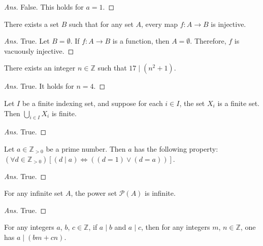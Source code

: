 \documentclass[12pt]{article}
\newenvironment{problem}[2][Problem]{\begin{trivlist}
\item[\hskip \labelsep {\bfseries #1}\hskip \labelsep {\bfseries #2.}]}{\end{trivlist}}
\begin{document}
\begin{proof}[Ans]
False. This holds for $a = 1$.
\end{proof}

\begin{problem}{17}
There exists a set $B$ such that for any set $A$,
every map $f : A \rightarrow B$ is injective.

\end{problem}

\begin{proof}[Ans]
True. Let $B = \emptyset$. If $f : A \to B$ is a function, then $A = \emptyset$. Therefore, $f$ is vacuously injective.
\end{proof}

\begin{problem}{18}
There exists an integer $n \in \mathbb{Z}$ such that $17 \mid (n^2+1)$.
\end{problem}

\begin{proof}[Ans]
True. It holds for $n = 4$.
\end{proof}

\begin{problem}{19}
Let $I$ be a finite indexing set, and suppose for each $i \in I$,
the set $X_i$ is a finite set. Then $\bigcup_{i \in I} X_i$ is finite.

\end{problem}

\begin{proof}[Ans]
True.
\end{proof}

\begin{problem}{20}
Let $a \in \mathbb{Z}_{>0}$ be a prime number. Then $a$ has the following property:
$(\forall d \in \mathbb{Z}_{>0}) \left[(d \mid a) \Leftrightarrow
((d = 1) \lor (d = a)) \right]$.
\end{problem}

\begin{proof}[Ans]
True.
\end{proof}

\begin{problem}{21}
 For any infinite set $A$, the power set $\mathcal{P}(A)$ is infinite.

\end{problem}

\begin{proof}[Ans]
True.
\end{proof}

\begin{problem}{22}
For any integers $a$, $b$, $c \in \mathbb{Z}$, if $a \mid b$ and $a \mid c$,
then for any integers $m$, $n \in \mathbb{Z}$, one has $a \mid (bm+cn)$.
\end{problem}
\end{document}
